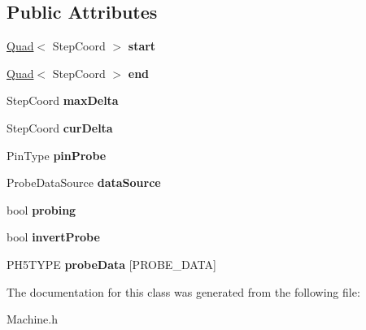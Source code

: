 \subsection*{Public Attributes}
\begin{DoxyCompactItemize}
\item 
\hypertarget{classfirestep_1_1_op_probe_a54509accd4d8988a7e9922b321dba8cc}{\hyperlink{classfirestep_1_1_quad}{Quad}$<$ Step\+Coord $>$ {\bfseries start}}\label{classfirestep_1_1_op_probe_a54509accd4d8988a7e9922b321dba8cc}

\item 
\hypertarget{classfirestep_1_1_op_probe_ab0bc3730b2de1f56bb04f4b2dce6e5ae}{\hyperlink{classfirestep_1_1_quad}{Quad}$<$ Step\+Coord $>$ {\bfseries end}}\label{classfirestep_1_1_op_probe_ab0bc3730b2de1f56bb04f4b2dce6e5ae}

\item 
\hypertarget{classfirestep_1_1_op_probe_aec7d6e41e2a0ad41cca58bc5bc6fbd47}{Step\+Coord {\bfseries max\+Delta}}\label{classfirestep_1_1_op_probe_aec7d6e41e2a0ad41cca58bc5bc6fbd47}

\item 
\hypertarget{classfirestep_1_1_op_probe_a2058a896655a2d893a4171a28115b00e}{Step\+Coord {\bfseries cur\+Delta}}\label{classfirestep_1_1_op_probe_a2058a896655a2d893a4171a28115b00e}

\item 
\hypertarget{classfirestep_1_1_op_probe_a3eef6faa8f450dd1418160c64e6b1e85}{Pin\+Type {\bfseries pin\+Probe}}\label{classfirestep_1_1_op_probe_a3eef6faa8f450dd1418160c64e6b1e85}

\item 
\hypertarget{classfirestep_1_1_op_probe_a0da566d41c33ea1902678677374ac2b8}{Probe\+Data\+Source {\bfseries data\+Source}}\label{classfirestep_1_1_op_probe_a0da566d41c33ea1902678677374ac2b8}

\item 
\hypertarget{classfirestep_1_1_op_probe_ae19616ba52b69ef0b51e1a47f030a207}{bool {\bfseries probing}}\label{classfirestep_1_1_op_probe_ae19616ba52b69ef0b51e1a47f030a207}

\item 
\hypertarget{classfirestep_1_1_op_probe_a6526a2c2745fc1844432d740a8a7a2e4}{bool {\bfseries invert\+Probe}}\label{classfirestep_1_1_op_probe_a6526a2c2745fc1844432d740a8a7a2e4}

\item 
\hypertarget{classfirestep_1_1_op_probe_a09468bc0628d58d264bb1d5d02da8726}{P\+H5\+T\+Y\+P\+E {\bfseries probe\+Data} \mbox{[}P\+R\+O\+B\+E\+\_\+\+D\+A\+T\+A\mbox{]}}\label{classfirestep_1_1_op_probe_a09468bc0628d58d264bb1d5d02da8726}

\end{DoxyCompactItemize}


The documentation for this class was generated from the following file\+:\begin{DoxyCompactItemize}
\item 
Machine.\+h\end{DoxyCompactItemize}
